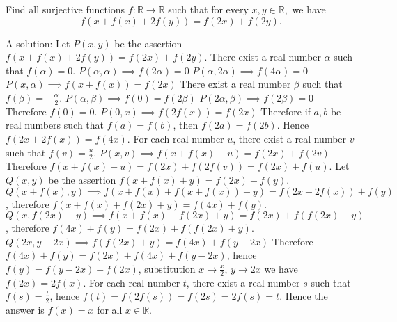 \begin{solution}
	\begin{tcolorbox}Find all surjective functions $f: \mathbb R \to \mathbb R$ such that for every $x,y\in \mathbb R,$ we have
\[f(x+f(x)+2f(y))=f(2x)+f(2y).\]\end{tcolorbox}
A solution:
Let $P(x,y)$ be the assertion $f\left(x+f(x)+2f(y)\right)=f(2x)+f(2y)$.
There exist a real number $\alpha$ such that $f(\alpha)=0$.
$P(\alpha,\alpha)\implies f(2\alpha)=0$
$P(\alpha,2\alpha)\implies f(4\alpha)=0$
$P(x,\alpha)\implies f\left(x+f(x)\right)=f(2x)$
There exist a real number $\beta$ such that $f(\beta)=-\frac{\alpha}{2}$.
$P(\alpha,\beta)\implies f(0)=f(2\beta)$
$P(2\alpha,\beta)\implies f(2\beta)=0$
Therefore $f(0)=0$.
$P(0,x)\implies f\left(2f(x)\right)=f(2x)$
Therefore if $a,b$ be real numbers such that $f(a)=f(b)$, then $f(2a)=f(2b)$.
Hence $f\left(2x+2f(x)\right)=f(4x)$.
For each real number $u$, there exist a real number $v$ such that $f(v)=\frac{u}{2}$.
$P(x,v)\implies f\left(x+f(x)+u\right)=f(2x)+f(2v)$
Therefore $f\left(x+f(x)+u\right)=f(2x)+f\left(2f(v)\right)=f(2x)+f(u)$.
Let $Q(x,y)$ be the assertion $f\left(x+f(x)+y\right)=f(2x)+f(y)$.
$Q(x+f(x),y)\implies f\left(x+f(x)+f\left(x+f(x)\right)+y\right)=f\left(2x+2f(x)\right)+f(y)$,
therefore $f\left(x+f(x)+f(2x)+y\right)=f(4x)+f(y)$.
$Q(x,f(2x)+y)\implies f(x+f(x)+f(2x)+y)=f(2x)+f(f(2x)+y)$,
therefore $f(4x)+f(y)=f(2x)+f\left(f(2x)+y\right)$.
$Q(2x,y-2x)\implies f\left(f(2x)+y\right)=f(4x)+f(y-2x)$
Therefore $f(4x)+f(y)=f(2x)+f(4x)+f(y-2x)$,
hence $f(y)=f(y-2x)+f(2x)$,
substitution $x\rightarrow\frac{x}{2}$, $y\rightarrow2x$ we have $f(2x)=2f(x)$.
For each real number $t$, there exist a real number $s$ such that $f(s)=\frac{t}{2}$,
hence $f(t)=f\left(2f(s)\right)=f(2s)=2f(s)=t$.
Hence the answer is $f(x)=x$ for all $x\in\mathbb{R}$.
\end{solution}







